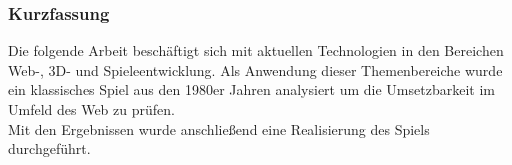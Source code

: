 \subsubsection{Kurzfassung}

Die folgende Arbeit beschäftigt sich mit aktuellen Technologien in den Bereichen Web-, 3D- und Spieleentwicklung. Als Anwendung dieser Themenbereiche wurde ein klassisches Spiel aus den 1980er Jahren analysiert um die Umsetzbarkeit im Umfeld des Web zu prüfen.\\
Mit den Ergebnissen wurde anschließend eine Realisierung des Spiels durchgeführt.
